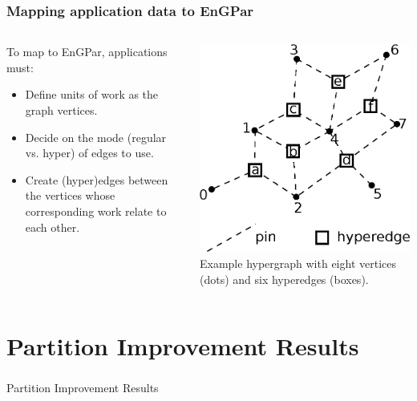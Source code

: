 \documentclass[aspectratio=169]{beamer}
\begin{document}
\begin{frame}
  \frametitle{Mapping application data to EnGPar}
  \begin{columns}
    \begin{column}{0.6\textwidth}
  To map to EnGPar, applications must:
  \begin{itemize}
  \item Define units of work as the graph vertices.
  \item Decide on the mode (regular vs. hyper) of edges to use.
  \item Create (hyper)edges between the vertices whose corresponding work relate to each other.
  \end{itemize}
    \end{column}
    \begin{column}{0.4\textwidth}
      \includegraphics[width=\textwidth]{figures/hypergraph.eps} \\
      \small{Example hypergraph with eight vertices (dots) and six hyperedges (boxes).}
    \end{column}
  \end{columns}
\end{frame}

\section{Partition Improvement Results}
\begin{frame}
  \frametitle{}
  \center \huge{Partition Improvement Results}
\end{frame}
\end{document}
